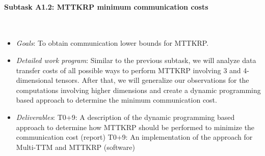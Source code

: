 \documentclass[a4paper,11pt]{article}
\newcommand{\subtask}[1]{{\color{orange}\paragraph{#1}$ $}}
\newcommand{\goal}{{\color{orange2}  \emph{Goals}:} }
\newcommand{\dwp}{{\color{orange2}  \emph{Detailed work program}: }}
\newcommand{\deliverables}{{\color{orange2}  \emph{Deliverables}: }}
\begin{document}
	\subtask{Subtask A1.2: MTTKRP minimum communication costs}
	\begin{itemize}[leftmargin=-1pt]
		\item[] \goal To obtain communication lower bounds for MTTKRP.
		\item[] \dwp Similar to the previous subtask, we will analyze data transfer costs of all possible ways to perform MTTKRP involving 3 and 4-dimensional tensors. After that, we will generalize our observations for the computations involving higher dimensions and create a dynamic programming based approach to determine the minimum communication cost.
		\item[] \deliverables T0+9: A description of the dynamic programming based approach to determine how MTTKRP should be performed to minimize the communication cost (report)\newline
		T0+9: An implementation of the approach for Multi-TTM and MTTKRP (software)	
	\end{itemize}
	
\end{document}
